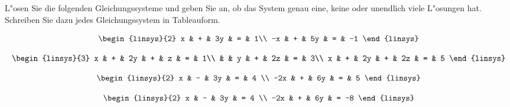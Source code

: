 L"osen Sie die folgenden Gleichungssysteme und geben Sie an,
ob das System genau eine, keine oder unendlich viele L"osungen
hat. Schreiben Sie dazu jedes Gleichungssystem in Tableauform.
\begin{teilaufgaben}
\item
\[
\begin{linsys}{2}
 x & + & 3y & = &  1\\
-x & + & 5y & = & -1
\end{linsys}
\]
\item
\[
\begin{linsys}{3}
x & + & 2y & + &  z & = & 1\\
  &   &  y & + & 2z & = & 3\\
x & + & 2y & + & 2z & = & 5 
\end{linsys}
\]
\item
\[
\begin{linsys}{2}
  x & - & 3y & = & 4 \\
-2x & + & 6y & = & 5
\end{linsys}
\]
\item
\[
\begin{linsys}{2}
  x & - & 3y & =  4 \\
-2x & + & 6y & = -8
\end{linsys}
\]
\end{teilaufgaben}


